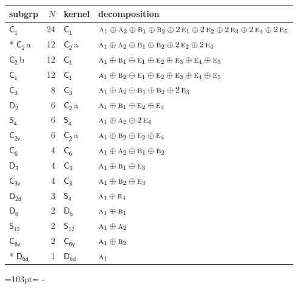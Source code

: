 \documentclass[10pt,a4paper]{article}
\newcommand{\needspace}[1]{\par\penalty-100\begingroup\dimen0=#1\relax\dimen2=\pagegoal
  \advance\dimen2-\pagetotal\ifdim\dimen0>\dimen2\relax\ifdim\dimen2>0pt\vfil\break\fi\fi
  \endgroup}
\numberwithin{equation}{section}
\newcommand{\grp}[1]{\mathsf{#1}}
\newcommand{\irr}[1]{\text{\normalfont\scshape #1}}
\newcommand{\clsletter}[1]{\,{\scriptsize\color{black!55}#1}}
\newlength{\fillwidth}\newlength{\cellwidth}\newlength{\colwidth}
\begin{document}
{\begin{longtable}{@{}lrl>{\RaggedRight\arraybackslash}p{\fillwidth}@{}}
subgrp & $N$ & kernel & decomposition\\\midrule\endhead
\bottomrule\endfoot\endlastfoot
\href{C1.pdf}{$\grp{C_{1}}$} & 24 & \href{C1.pdf}{$\grp{C_{1}}$} & $\irr{a}_{1}\oplus \irr{a}_{2}\oplus \irr{b}_{1}\oplus \irr{b}_{2}\oplus 2\,\irr{e}_{1}\oplus 2\,\irr{e}_{2}\oplus 2\,\irr{e}_{3}\oplus 2\,\irr{e}_{4}\oplus 2\,\irr{e}_{5}$\\*
\href{C2.pdf}{$\grp{C_{2}}$}\clsletter{a} & 12 & \href{C2.pdf}{$\grp{C_{2}}$}\clsletter{a} & $\irr{a}_{1}\oplus \irr{a}_{2}\oplus \irr{b}_{1}\oplus \irr{b}_{2}\oplus 2\,\irr{e}_{2}\oplus 2\,\irr{e}_{4}$\\
\href{C2.pdf}{$\grp{C_{2}}$}\clsletter{b} & 12 & \href{C1.pdf}{$\grp{C_{1}}$} & $\irr{a}_{1}\oplus \irr{b}_{1}\oplus \irr{e}_{1}\oplus \irr{e}_{2}\oplus \irr{e}_{3}\oplus \irr{e}_{4}\oplus \irr{e}_{5}$\\
\href{C1v.pdf}{$\grp{C_{s}}$} & 12 & \href{C1.pdf}{$\grp{C_{1}}$} & $\irr{a}_{1}\oplus \irr{b}_{2}\oplus \irr{e}_{1}\oplus \irr{e}_{2}\oplus \irr{e}_{3}\oplus \irr{e}_{4}\oplus \irr{e}_{5}$\\
\href{C3.pdf}{$\grp{C_{3}}$} & 8 & \href{C3.pdf}{$\grp{C_{3}}$} & $\irr{a}_{1}\oplus \irr{a}_{2}\oplus \irr{b}_{1}\oplus \irr{b}_{2}\oplus 2\,\irr{e}_{3}$\\
\href{D2.pdf}{$\grp{D_{2}}$} & 6 & \href{C2.pdf}{$\grp{C_{2}}$}\clsletter{a} & $\irr{a}_{1}\oplus \irr{b}_{1}\oplus \irr{e}_{2}\oplus \irr{e}_{4}$\\
\href{S4.pdf}{$\grp{S_{4}}$} & 6 & \href{S4.pdf}{$\grp{S_{4}}$} & $\irr{a}_{1}\oplus \irr{a}_{2}\oplus 2\,\irr{e}_{4}$\\
\href{C2v.pdf}{$\grp{C_{2v}}$} & 6 & \href{C2.pdf}{$\grp{C_{2}}$}\clsletter{a} & $\irr{a}_{1}\oplus \irr{b}_{2}\oplus \irr{e}_{2}\oplus \irr{e}_{4}$\\
\href{C6.pdf}{$\grp{C_{6}}$} & 4 & \href{C6.pdf}{$\grp{C_{6}}$} & $\irr{a}_{1}\oplus \irr{a}_{2}\oplus \irr{b}_{1}\oplus \irr{b}_{2}$\\
\href{D3.pdf}{$\grp{D_{3}}$} & 4 & \href{C3.pdf}{$\grp{C_{3}}$} & $\irr{a}_{1}\oplus \irr{b}_{1}\oplus \irr{e}_{3}$\\
\href{C3v.pdf}{$\grp{C_{3v}}$} & 4 & \href{C3.pdf}{$\grp{C_{3}}$} & $\irr{a}_{1}\oplus \irr{b}_{2}\oplus \irr{e}_{3}$\\
\href{D2d.pdf}{$\grp{D_{2d}}$} & 3 & \href{S4.pdf}{$\grp{S_{4}}$} & $\irr{a}_{1}\oplus \irr{e}_{4}$\\
\href{D6.pdf}{$\grp{D_{6}}$} & 2 & \href{D6.pdf}{$\grp{D_{6}}$} & $\irr{a}_{1}\oplus \irr{b}_{1}$\\
\href{S12.pdf}{$\grp{S_{12}}$} & 2 & \href{S12.pdf}{$\grp{S_{12}}$} & $\irr{a}_{1}\oplus \irr{a}_{2}$\\
\href{C6v.pdf}{$\grp{C_{6v}}$} & 2 & \href{C6v.pdf}{$\grp{C_{6v}}$} & $\irr{a}_{1}\oplus \irr{b}_{2}$\\*
\href{D6d.pdf}{$\grp{D_{6d}}$} & 1 & \href{D6d.pdf}{$\grp{D_{6d}}$} & $\irr{a}_{1}$\\
\bottomrule\end{longtable}}
\needspace{103pt}
\end{document}
